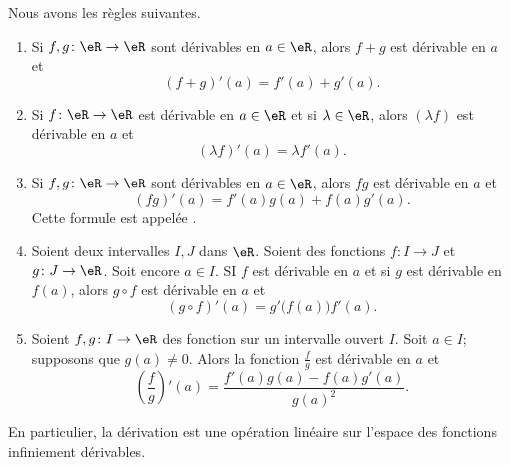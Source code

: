 \begin{proposition}     \label{PROPooOUZOooEcYKxn}
	Nous avons les règles suivantes.
	\begin{enumerate}
		\item       \label{ITEMooTFNPooYngHnD}
		      Si \( f,g\colon \eR\to \eR\) sont dérivables en \( a\in \eR\), alors \( f+g\) est dérivable en \( a\) et
		      \begin{equation}
			      (f+g)'(a)=f'(a)+g'(a).
		      \end{equation}
		\item       \label{ITEMooIPLRooOZXqMg}
		      Si \( f\colon \eR\to \eR\) est dérivable en \( a\in \eR\) et si \( \lambda\in \eR\), alors \( (\lambda f)\) est dérivable en \( a\) et
		      \begin{equation}
			      (\lambda f)'(a)=\lambda f'(a).
		      \end{equation}
		\item   \label{ITEMooMQERooBCqnvS}
		      Si \( f,g\colon \eR\to \eR\) sont dérivables en \( a\in \eR\), alors \( fg\) est dérivable en \( a\) et
		      \begin{equation}
			      (fg)'(a)=f'(a)g(a)+f(a)g'(a).
		      \end{equation}
		      Cette formule est appelée .
		\item   \label{ITEMooLYZCooVUPTyh}
		      Soient deux intervalles \( I,J\) dans \( \eR\). Soient des fonctions \( f\colon I\to J\) et \( g\colon J\to \eR\). Soit encore \( a\in I\). SI \( f\) est dérivable en \( a\) et si \( g\) est dérivable en \( f(a)\), alors \( g\circ f\) est dérivable en \( a\) et
		      \begin{equation}
			      (g\circ f)'(a)= g'\big( f(a) \big)f'(a).
		      \end{equation}
		\item      \label{ITEMooMUNQooLiKffz}
		      Soient \( f,g\colon I\to \eR\) des fonction sur un intervalle ouvert \( I\). Soit \( a\in I\); supposons que \( g(a)\neq 0\). Alors la fonction \( \frac{ f }{ g }\) est dérivable en \( a\) et
		      \begin{equation}
			      \left( \frac{ f }{ g } \right)'(a)=\frac{ f'(a)g(a)-f(a)g'(a) }{ g(a)^2 }.
		      \end{equation}
	\end{enumerate}
	En particulier, la dérivation est une opération linéaire sur l'espace des fonctions infiniement dérivables.
\end{proposition}

